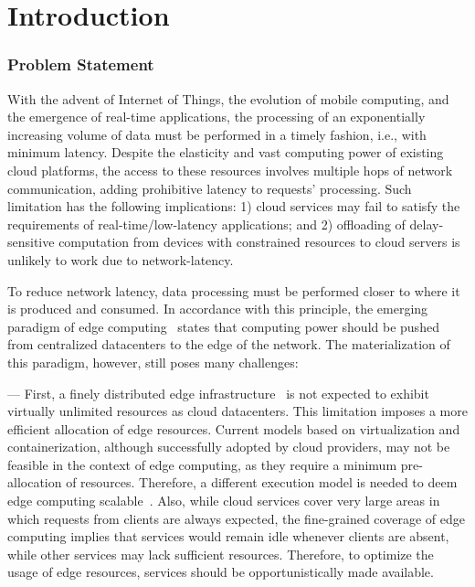 \section{Introduction}


\subsubsection*{Problem Statement}

With the advent of Internet of Things, the evolution of mobile computing, and the emergence of real-time applications, the processing of an exponentially increasing volume of data must be performed in a timely fashion, i.e., with minimum latency. Despite the elasticity and vast computing power of existing cloud platforms, the access to these resources involves multiple hops of network communication, adding prohibitive latency to requests' processing. Such limitation has the following implications: 1) cloud services may fail to satisfy the requirements of real-time/low-latency applications; and 2) offloading of delay-sensitive computation from devices with constrained resources to cloud servers is unlikely to work due to network-latency.

To reduce network latency, data processing must be performed closer to where it is produced and consumed. In accordance with this principle, the emerging paradigm of edge computing~\cite{Shi:2016} states that computing power should be pushed from centralized datacenters to the edge of the network. 
The materialization of this paradigm, however, still poses many challenges:

--- First, a finely distributed edge infrastructure~\cite{Dehos14millimeter5g} is not expected to exhibit virtually unlimited resources as cloud datacenters. This limitation imposes a more efficient allocation of edge resources. Current models based on virtualization and containerization, although successfully adopted by cloud providers, may not be feasible in the context of edge computing, as they require a minimum pre-allocation of resources. Therefore, a different execution model is needed to deem edge computing scalable~\cite{GarrigaMendonca2017}. Also, while cloud services cover very large areas in which requests from clients are always expected, the fine-grained coverage of edge computing implies that services would remain idle whenever clients are absent, while other services may lack sufficient resources. Therefore, to optimize the usage of edge resources, services should be opportunistically made available.

